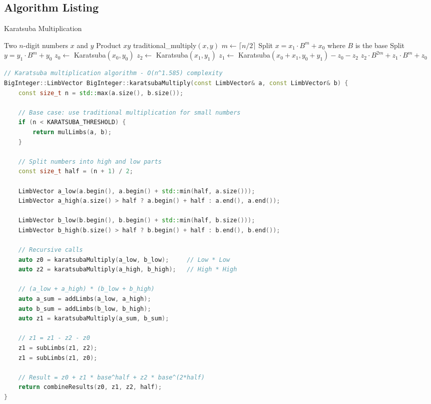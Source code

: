 \documentclass[12pt,a4paper]{article}
\theoremstyle{definition}
\begin{document}
\subsection{Algorithm Listing}

\begin{algorithm}[H]
\caption{Karatsuba Multiplication}
\label{alg:karatsuba}
\begin{algorithmic}[1]
\REQUIRE Two $n$-digit numbers $x$ and $y$
\ENSURE Product $xy$
    \RETURN traditional\_multiply$(x, y)$
\ENDIF
\STATE $m \leftarrow \lceil n/2 \rceil$
\STATE Split $x = x_1 \cdot B^m + x_0$ where $B$ is the base
\STATE Split $y = y_1 \cdot B^m + y_0$
\STATE $z_0 \leftarrow$ Karatsuba$(x_0, y_0)$
\STATE $z_2 \leftarrow$ Karatsuba$(x_1, y_1)$
\STATE $z_1 \leftarrow$ Karatsuba$(x_0 + x_1, y_0 + y_1) - z_0 - z_2$
\RETURN $z_2 \cdot B^{2m} + z_1 \cdot B^m + z_0$
\end{algorithmic}
\end{algorithm}

\begin{lstlisting}[language=C++,caption={Karatsuba Implementation},label={lst:karatsuba}]
// Karatsuba multiplication algorithm - O(n^1.585) complexity
BigInteger::LimbVector BigInteger::karatsubaMultiply(const LimbVector& a, const LimbVector& b) {
    const size_t n = std::max(a.size(), b.size());
    
    // Base case: use traditional multiplication for small numbers
    if (n < KARATSUBA_THRESHOLD) {
        return mulLimbs(a, b);
    }
    
    // Split numbers into high and low parts
    const size_t half = (n + 1) / 2;
    
    LimbVector a_low(a.begin(), a.begin() + std::min(half, a.size()));
    LimbVector a_high(a.size() > half ? a.begin() + half : a.end(), a.end());
    
    LimbVector b_low(b.begin(), b.begin() + std::min(half, b.size()));
    LimbVector b_high(b.size() > half ? b.begin() + half : b.end(), b.end());
    
    // Recursive calls
    auto z0 = karatsubaMultiply(a_low, b_low);     // Low * Low
    auto z2 = karatsubaMultiply(a_high, b_high);   // High * High
    
    // (a_low + a_high) * (b_low + b_high)
    auto a_sum = addLimbs(a_low, a_high);
    auto b_sum = addLimbs(b_low, b_high);
    auto z1 = karatsubaMultiply(a_sum, b_sum);
    
    // z1 = z1 - z2 - z0
    z1 = subLimbs(z1, z2);
    z1 = subLimbs(z1, z0);
    
    // Result = z0 + z1 * base^half + z2 * base^(2*half)
    return combineResults(z0, z1, z2, half);
}
\end{lstlisting}
\end{document}

